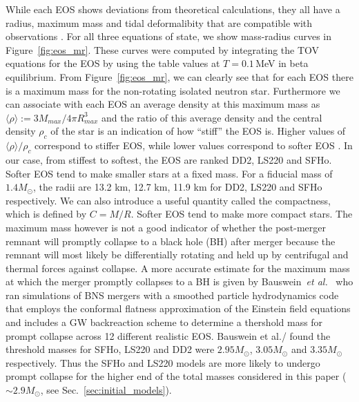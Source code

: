 While each EOS shows deviations from theoretical calculations, they all have a radius, maximum mass and tidal deformalibity that are compatible with observations \cite{demorest:2010bx,hempel2017well}. For all three equations of state, we show mass-radius curves in Figure~\ref{fig:eos_mr}. These curves were computed by integrating the TOV equations for the EOS by using the table values at $T=0.1$\,MeV in beta equilibrium. From Figure~\ref{fig:eos_mr}, we can clearly see that for each EOS there is a maximum mass for the non-rotating isolated neutron star. Furthermore we can associate with each EOS an average density at this maximum mass as $\langle \rho \rangle := 3M_{max}/4\pi R^3_{max}$ and the ratio of this average density and the central density $\rho_c$ of the star is an indication of how ``stiff'' the EOS is. Higher values of $\langle \rho \rangle/\rho_c$ correspond to stiffer EOS, while lower values correspond to softer EOS \cite{bauswein2013prompt}. In our case, from stiffest to softest, the EOS are ranked DD2, LS220 and SFHo. Softer EOS tend to make smaller stars at a fixed mass. For a fiducial mass of $1.4M_\odot$, the radii are 13.2 km, 12.7 km, 11.9 km for DD2, LS220 and SFHo respectively. We can also introduce a useful quantity called the compactness, which is defined by $C=M/R$. Softer EOS tend to make more compact stars. The maximum mass however is not a good indicator of whether the post-merger remnant will promptly collapse to a black hole (BH) after merger because the remnant will most likely be differentially rotating and held up by centrifugal and thermal forces against collapse.
A more accurate estimate for the maximum mass at which the merger promptly collapses to a BH is given by Bauswein~{\it et al.}~\cite{bauswein2013prompt} who ran simulations of BNS mergers with a smoothed particle hydrodynamics code that employs the conformal flatness approximation of the Einstein field equations and includes a GW backreaction scheme to determine a thershold mass for prompt collapse across 12 different realistic EOS. Bauswein et al./ found the threshold masses for SFHo, LS220 and DD2 were $2.95M_\odot$, $3.05M_\odot$ and $3.35M_\odot$ respectively. Thus the SFHo and LS220 models are more likely to undergo prompt collapse for the higher end of the total masses considered in this paper ($\sim 2.9M_\odot$, see Sec.~\ref{sec:initial_models}). 


